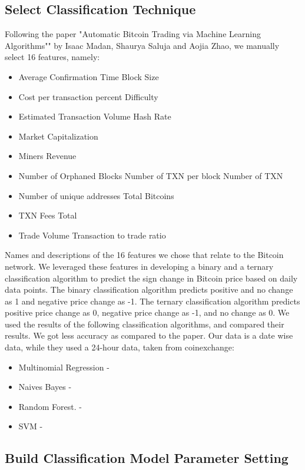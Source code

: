 \documentclass{article}
\begin{document}
\subsection{Select Classification
Technique }
Following the paper "Automatic Bitcoin Trading via Machine Learning Algorithms"" by Isaac Madan, Shaurya Saluja and Aojia Zhao, we manually select 16 features, namely:
\begin{itemize}
\item Average Confirmation Time Block Size
\item Cost per transaction percent Difficulty
\item Estimated Transaction Volume Hash Rate
\item Market Capitalization
\item Miners Revenue
\item Number of Orphaned Blocks Number of TXN per block Number of TXN
\item Number of unique addresses Total Bitcoins
\item TXN Fees Total
\item Trade Volume Transaction to trade ratio
\end{itemize}

Names and descriptions of the 16 features we chose that relate to the Bitcoin network. We leveraged these features in developing a binary and a ternary classification algorithm to predict the sign change in Bitcoin price based on daily data points. The binary classification algorithm predicts positive and no change as 1 and negative price change as -1. The ternary classification algorithm predicts positive price change as 0, negative price change as -1, and no change as 0. We used the results of the following classification algorithms, and compared their results. We got less accuracy as compared to the paper. Our data is a date wise data, while they used a 24-hour data, taken from coinexchange:
\begin{itemize}
\item Multinomial Regression  -
\item Naives Bayes		      -
\item Random Forest.             -
\item SVM 		              -
 \end{itemize}

\subsection {Build Classification Model Parameter Setting}
\end{document}
